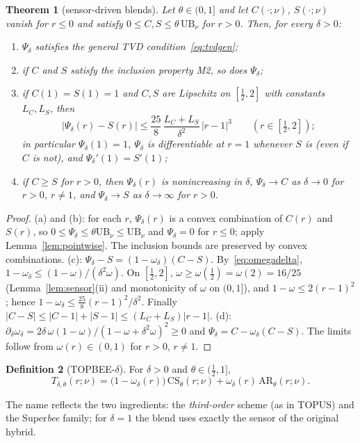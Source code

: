 \documentclass[11pt]{article}
\newcommand{\UB}{\mathrm{UB}}
\newcommand{\scheme}{TOPBEE-$\delta$}
\theoremstyle{plain}
\newtheorem{theorem}{Theorem}[section]
\theoremstyle{definition}
\newtheorem{definition}[theorem]{Definition}
\begin{document}
\begin{theorem}[sensor-driven blends]\label{thm:inherit}
Let $\theta\in(0,1]$ and let $C(\cdot;\nu)$, $S(\cdot;\nu)$ vanish for $r\le0$ and satisfy $0\le C,S\le\theta\,\UB_\nu$ for $r>0$. Then, for every $\delta>0$:
\begin{enumerate}
\item[(a)] $\Psi_\delta$ satisfies the general TVD condition~\eqref{eq:tvdgen};
\item[(b)] if $C$ and $S$ satisfy the inclusion property M2, so does $\Psi_\delta$;
\item[(c)] if $C(1)=S(1)=1$ and $C,S$ are Lipschitz on $[\frac12,2]$ with constants $L_C,L_S$, then
\[
|\Psi_\delta(r)-S(r)|\le\frac{25}{8}\,\frac{L_C+L_S}{\delta^2}\,|r-1|^3\qquad (r\in[\tfrac12,2]);
\]
in particular $\Psi_\delta(1)=1$, $\Psi_\delta$ is differentiable at $r=1$ whenever $S$ is (even if $C$ is not), and $\Psi_\delta'(1)=S'(1)$;
\item[(d)] if $C\ge S$ for $r>0$, then $\Psi_\delta(r)$ is nonincreasing in $\delta$, $\Psi_\delta\to C$ as $\delta\to0$ for $r>0$, $r\ne1$, and $\Psi_\delta\to S$ as $\delta\to\infty$ for $r>0$.
\end{enumerate}
\end{theorem}
\begin{proof}
(a) and (b): for each $r$, $\Psi_\delta(r)$ is a convex combination of $C(r)$ and $S(r)$, so $0\le\Psi_\delta\le\theta\UB_\nu\le\UB_\nu$ and $\Psi_\delta=0$ for $r\le0$; apply Lemma~\ref{lem:pointwise}. The inclusion bounds are preserved by convex combinations.
(c): $\Psi_\delta-S=(1-\omega_\delta)(C-S)$. By~\eqref{eq:omegadelta}, $1-\omega_\delta\le(1-\omega)/(\delta^2\omega)$. On $[\frac12,2]$, $\omega\ge\omega(\frac12)=\omega(2)=16/25$ (Lemma~\ref{lem:sensor}(ii) and monotonicity of $\omega$ on $(0,1]$), and $1-\omega\le2(r-1)^2$; hence $1-\omega_\delta\le\frac{25}{8}(r-1)^2/\delta^2$. Finally $|C-S|\le|C-1|+|S-1|\le(L_C+L_S)|r-1|$.
(d): $\partial_\delta\omega_\delta=2\delta\,\omega(1-\omega)/(1-\omega+\delta^2\omega)^2\ge0$ and $\Psi_\delta=C-\omega_\delta(C-S)$. The limits follow from $\omega(r)\in(0,1)$ for $r>0$, $r\ne1$.
\end{proof}

\begin{definition}[\scheme]
For $\delta>0$ and $\theta\in(\frac12,1]$,
\begin{equation}\label{eq:topbee}
T_{\delta,\theta}(r;\nu)=\bigl(1-\omega_\delta(r)\bigr)\,\mathrm{CS}_\theta(r;\nu)+\omega_\delta(r)\,\mathrm{AR}_\theta(r;\nu).
\end{equation}
\end{definition}
The name reflects the two ingredients: the \emph{third-order} scheme (as in TOPUS) and the Super\emph{bee} family; for $\delta=1$ the blend uses exactly the sensor of the original hybrid.
\end{document}
